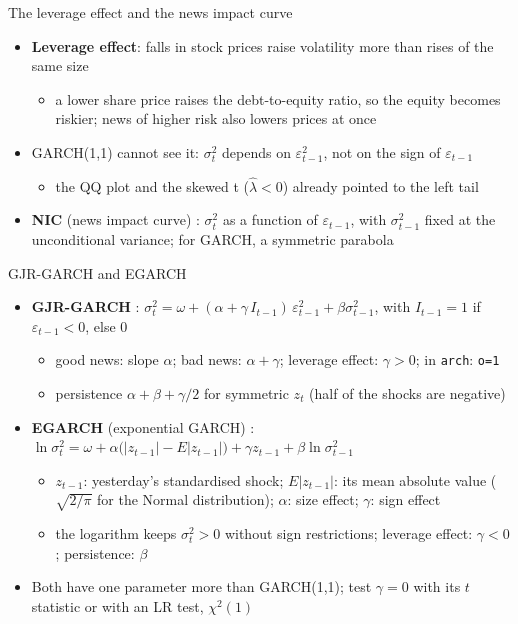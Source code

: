 \begin{frame}{The leverage effect and the news impact curve}
\itemsize{\small}
\begin{itemize}
    \item \textbf{Leverage effect}: falls in stock prices raise volatility more than rises of the same size 
    \begin{itemize}
        \item a lower share price raises the debt-to-equity ratio, so the equity becomes riskier; news of higher risk also lowers prices at once
    \end{itemize}
    \item GARCH(1,1) cannot see it: $\sigma_t^2$ depends on $\varepsilon_{t-1}^2$, not on the sign of $\varepsilon_{t-1}$
    \begin{itemize}
        \item the QQ plot and the skewed t ($\hat\lambda < 0$) already pointed to the left tail
    \end{itemize}
    \item \textbf{NIC} (news impact curve) : $\sigma_t^2$ as a function of $\varepsilon_{t-1}$, with $\sigma_{t-1}^2$ fixed at the unconditional variance; for GARCH, a symmetric parabola
\end{itemize}
\end{frame}

\begin{frame}{GJR-GARCH and EGARCH}
\itemsize{\small}
\begin{itemize}
    \item \textbf{GJR-GARCH} : $\sigma_t^2 = \omega + (\alpha + \gamma\,I_{t-1})\,\varepsilon_{t-1}^2 + \beta\sigma_{t-1}^2$, with $I_{t-1} = 1$ if $\varepsilon_{t-1} < 0$, else 0
    \begin{itemize}
        \item good news: slope $\alpha$; bad news: $\alpha + \gamma$; leverage effect: $\gamma > 0$; in \texttt{arch}: \texttt{o=1}
        \item persistence $\alpha + \beta + \gamma/2$ for symmetric $z_t$ (half of the shocks are negative)
    \end{itemize}
    \item \textbf{EGARCH} (exponential GARCH) : $\ln\sigma_t^2 = \omega + \alpha\big(|z_{t-1}| - E|z_{t-1}|\big) + \gamma z_{t-1} + \beta\ln\sigma_{t-1}^2$
    \begin{itemize}
        \item $z_{t-1}$: yesterday's standardised shock; $E|z_{t-1}|$: its mean absolute value ($\sqrt{2/\pi}$ for the Normal distribution); $\alpha$: size effect; $\gamma$: sign effect
        \item the logarithm keeps $\sigma_t^2 > 0$ without sign restrictions; leverage effect: $\gamma < 0$; persistence: $\beta$
    \end{itemize}
    \item Both have one parameter more than GARCH(1,1); test $\gamma = 0$ with its $t$ statistic or with an LR test, $\chi^2(1)$
\end{itemize}
\end{frame}

